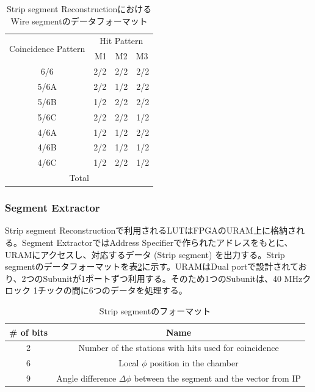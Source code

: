 \begin{table}[]
    \centering
    \caption{Strip segment ReconstructionにおけるWire segmentのデータフォーマット}
    \label{tab:SegmentReco_strip}
    \begin{tabular}{|cc|}
    \hline
    \multicolumn{1}{|c|}{\multirow{2}{*}{Coincidence Pattern}} & Hit Pattern \\ \cline{2-2} 
    \multicolumn{1}{|c|}{}                                     & M1　M2　M3    \\ \hline\hline
    \multicolumn{1}{|c|}{6/6}                                  & 2/2　2/2　2/2 \\ \hline
    \multicolumn{1}{|c|}{5/6A}                                 & 2/2　1/2　2/2 \\ \hline
    \multicolumn{1}{|c|}{5/6B}                                 & 1/2　2/2　2/2 \\ \hline
    \multicolumn{1}{|c|}{5/6C}                                 & 2/2　2/2　1/2 \\ \hline
    \multicolumn{1}{|c|}{4/6A}                                 & 1/2　1/2　2/2 \\ \hline
    \multicolumn{1}{|c|}{4/6B}                                 & 2/2　1/2　1/2 \\ \hline
    \multicolumn{1}{|c|}{4/6C}                                 & 1/2　2/2　1/2 \\ \hline\hline
    \multicolumn{2}{|c|}{Total}                                              \\ \hline
    \end{tabular}
\end{table}

\subsubsection*{Segment Extractor}
Strip segment Reconstructionで利用されるLUTはFPGAのURAM上に格納される。Segment ExtractorではAddress Specifierで作られたアドレスをもとに、URAMにアクセスし、対応するデータ (Strip segment) を出力する。Strip segmentのデータフォーマットを表\ref{tab:StripSegment}に示す。URAMはDual portで設計されており、2つのSubunitが1ポートずつ利用する。そのため1つのSubunitは、40 MHzクロック 1チックの間に6つのデータを処理する。

\begin{table}[]
    \centering
    \caption{Strip segmentのフォーマット}
    \label{tab:StripSegment}
    \begin{tabular}{|c|c|}
    \hline
    \# of bits & Name                                                                     \\ \hline\hline
    2          & Number of the stations with hits used for coincidence                    \\ \hline
    6          & Local $\phi$ position in the chamber                                     \\ \hline
    9          & Angle difference $\Delta\phi$ between the segment and the vector from IP \\ \hline
    \end{tabular}
\end{table}

